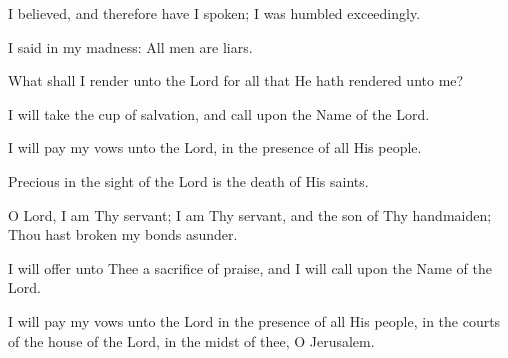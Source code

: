 I believed, and therefore have I spoken; I was humbled exceedingly.

I said in my madness: All men are liars.

What shall I render unto the Lord for all that He hath rendered unto me?

I will take the cup of salvation, and call upon the Name of the Lord.

I will pay my vows unto the Lord, in the presence of all His people.

Precious in the sight of the Lord is the death of His saints.

O Lord, I am Thy servant; I am Thy servant, and the son of Thy handmaiden; Thou hast broken my bonds asunder.

I will offer unto Thee a sacrifice of praise, and I will call upon the Name of the Lord.

I will pay my vows unto the Lord in the presence of all His people, in the courts of the house of the Lord, in the midst of thee, O Jerusalem.
